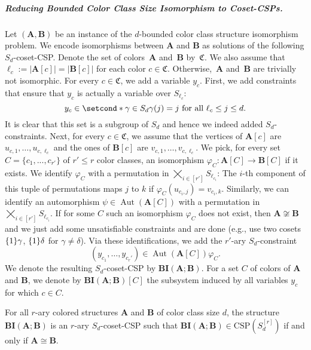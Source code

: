 \documentclass[a4paper,english, thm-restate]{lipics-v2021}
\renewcommand{\phi}{\varphi}
\newcommand{\iso}{\cong}
\DeclarePairedDelimiter\set{\lbrace}{\rbrace}
\newcommand{\StructA}{\mathbf{A}}
\newcommand{\StructB}{\mathbf{B}}
\newcommand{\CSP}[1]{\mathrm{CSP}(#1)}
\newcommand{\autgrp}[1]{\operatorname*{Aut}(#1)}
\newcommand{\bcisosys}[2]{\mathbf{BI}(#1;#2)}
\newcommand{\colors}{\mathfrak{C}}
\newcommand{\CosetGrpTmplt}[2]{#1^{[#2]}}
\newcommand{\Sym}[1]{S_{#1}}
\begin{document}
	\subparagraph*{Reducing Bounded Color Class Size Isomorphism to Coset-CSPs.}
	Let $(\StructA, \StructB)$ be an instance of the $d$-bounded color class structure isomorphism problem.
	We encode isomorphisms between $\StructA$ and $\StructB$
	as solutions of the following $\Sym{d}$-coset-CSP.
	Denote the set of colors~$\StructA$ and~$\StructB$ by~$\colors$.
	We also assume that $\ell_c := |\StructA[c]| = |\StructB[c]|$ for each color $c \in \colors$.
	Otherwise,~$\StructA$ and~$\StructB$ are trivially not isomorphic.
	For every $c\in \colors$, we add a variable $y_c$.
	First, we add constraints that ensure that $y_c$ is actually a variable over $\Sym{\ell_c}$:
	\[y_c \in \setcond*{\gamma \in \Sym{d}}{\gamma(j) = j \text{ for all } \ell_c \leq j \leq d}.\]
	It is clear that this set is a subgroup of $S_d$ and hence we indeed added $S_d$-constraints.
	Next, for every $c \in \colors$, we assume that the vertices of
	$\StructA[c]$ are $u_{c,1},\dots, u_{c,\ell_c}$ and the ones of $\StructB[c]$
	are $v_{c,1},\dots, v_{c,\ell_c}$.
	We pick, for every set $C = \{c_1,...,c_{r'}\}$ of $r' \leq r$ color classes, an isomorphism $\phi_C \colon \StructA[C] \to \StructB[C]$ if it exists. We identify $\phi_C$
	with a permutation in $\bigtimes_{i \in [r']} \Sym{\ell_{c_i}}$: The $i$-th component of this tuple of permutations maps
	$j$ to $k$ if $\phi_C(u_{c_i,j}) = v_{c_i,k}$.
	Similarly, we can identify an automorphism $\psi \in \autgrp{\StructA[C]}$
	with a permutation in $\bigtimes_{i \in [r']} \Sym{\ell_{c_i}}$.
	If for some $C$ such an isomorphism $\phi_C$ does not exist, then $\StructA \not\iso \StructB$ and we just add some unsatisfiable constraints and are done (e.g., use two cosets $\set{1}\gamma$, $\set{1}\delta$ for $\gamma \neq \delta$).
	Via these identifications, we add the $r'$-ary $\Sym{d}$-constraint
	\[(y_{c_1},\dots, y_{c_r'}) \in \autgrp{\StructA[C]}\phi_C.\]
	We denote the resulting $\Sym{d}$-coset-CSP by $\bcisosys{\StructA}{\StructB}$.
	For a set $C$ of colors of $\StructA$ and $\StructB$,
	we denote by $\bcisosys{\StructA}{\StructB}[C]$
	the subsystem induced by all variables $y_c$ for which $c \in C$.
	
	
	\begin{lemma}
		\label{lem:iso-system-correct}
		For all $r$-ary colored structures $\StructA$ and $\StructB$ of color class size $d$,
		the structure $\bcisosys{\StructA}{\StructB}$ is an $r$-ary $S_{d}$-coset-CSP
		such that $\bcisosys{\StructA}{\StructB} \in \CSP{\CosetGrpTmplt{\Sym{d}}{r}}$ if and only if
		$\StructA \iso \StructB$.
	\end{lemma}
	
\end{document}
